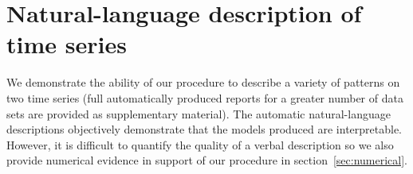 \documentclass{article}
\begin{document}
\section{Natural-language description of time series}
\label{sec:examples}
We demonstrate the ability of our procedure to describe a variety of patterns on two time series (full automatically produced reports for a greater number of data sets are provided as supplementary material).
The automatic natural-language descriptions objectively demonstrate that the models produced are interpretable.
However, it is difficult to quantify the quality of a verbal description so we also provide numerical evidence in support of our procedure in section~\ref{sec:numerical}.

%
%
%
%
%
%
\end{document}
